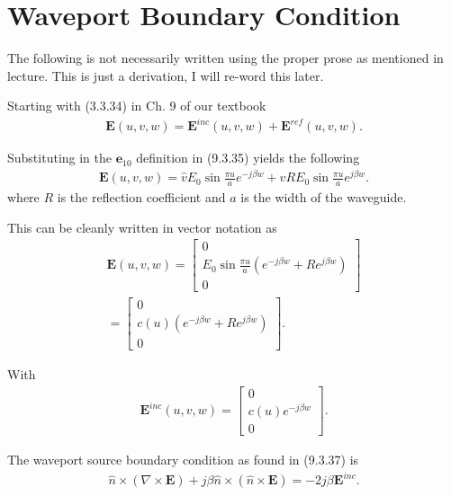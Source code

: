 \section{Waveport Boundary Condition}
\label{sec:wavebc}

The following is not necessarily written using the proper prose as mentioned in lecture. This is just a derivation, I will re-word this later.

Starting with (3.3.34) in Ch. 9 of our textbook
\begin{align}
    \textbf{E}(u,v,w) = \textbf{E}^{inc}(u,v,w) + \textbf{E}^{ref}(u,v,w).
\end{align}

Substituting in the $\textbf{e}_{10}$ definition in (9.3.35) yields the following
\begin{align}
    \textbf{E}(u,v,w) = \hat{v}E_0\sin{\frac{\pi u}{a}} e^{-j\beta w} + \hat{v}RE_0\sin{\frac{\pi u}{a}} e^{j\beta w}.
\end{align} 
where $R$ is the reflection coefficient and $a$ is the width of the waveguide.

This can be cleanly written in vector notation as
\begin{multline}
    \textbf{E}(u,v,w) =\begin{bmatrix}
        0 \\
        E_0\sin{\frac{\pi u}{a}}(e^{-j\beta w}+Re^{j\beta w})\\
        0
    \end{bmatrix}  \\ =\begin{bmatrix}
        0 \\
        c(u)(e^{-j\beta w}+Re^{j\beta w})\\
        0
    \end{bmatrix}.
\end{multline}

With 
\begin{align}
    \textbf{E}^{inc}(u,v,w) =\begin{bmatrix}
        0 \\
        c(u)e^{-j\beta w}\\
        0
    \end{bmatrix}.
\end{align}

The waveport source boundary condition as found in (9.3.37) is 
\begin{align}
    \hat{n}\times(\nabla\times\textbf{E})+j\beta\hat{n}\times(\hat{n}\times\textbf{E})=-2j\beta\textbf{E}^{inc}.
    \label{wavbc}
\end{align}

